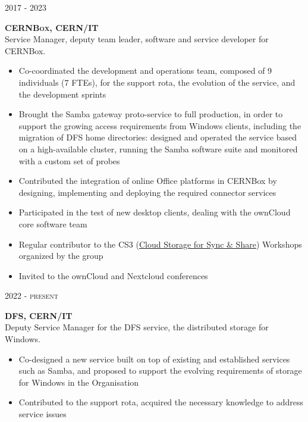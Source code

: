 \documentclass[11pt]{article}
\renewcommand{\subsection}[2]%
        {
         {\bf{\raggedright \scshape #1}}{\bf{\hfill \scshape #2}}\\[-.7\baselineskip]
}
\newenvironment{CompactItemize} {
  \begin{itemize}
  \setlength{\itemsep}{-3pt}
  \setlength{\parsep}{0pt}
  \setlength{\topsep}{-2pt}
  \setlength{\partopsep}{-2pt}
} {\end{itemize}}
\begin{document}
\subsection{2017 - 2023}{CERNBox, CERN/IT}

Service Manager, deputy team leader, software and service developer for CERNBox.

\begin{CompactItemize}
\item Co-coordinated the development and operations team, composed of 9 individuals (7 FTEs), for the support rota, the evolution of the service, and the development sprints
\item Brought the Samba gateway proto-service to full production, in order to support the growing access requirements from Windows clients, including the migration of DFS home directories: designed and operated the service based on a high-available cluster, running the Samba software suite and monitored with a custom set of probes
\item Contributed the integration of online Office platforms in CERNBox by designing, implementing and deploying the required connector services
\item Participated in the test of new desktop clients, dealing with the ownCloud core software team
\item Regular contributor to the CS3 (\href{https://www.cs3community.org/}{Cloud Storage for Sync \& Share}) Workshops organized by the group
\item Invited to the ownCloud and Nextcloud conferences
\end{CompactItemize}

\subsection{2022 - present}{DFS, CERN/IT}

Deputy Service Manager for the DFS service, the distributed storage for Windows.

\begin{CompactItemize}
\item Co-designed a new service built on top of existing and established services such as Samba, and proposed to support the evolving requirements of storage for Windows in the Organisation
\item Contributed to the support rota, acquired the necessary knowledge to address service issues
\end{CompactItemize}
\end{document}
